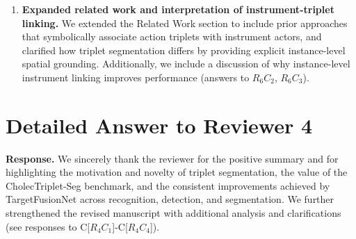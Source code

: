 \documentclass{article}
\begin{document}
\begin{enumerate}
    \item \textbf{Expanded related work and interpretation of instrument-triplet linking.}
    We extended the Related Work section to include prior approaches that symbolically associate action triplets with instrument actors, and clarified how triplet segmentation differs by providing explicit instance-level spatial grounding. Additionally, we include a discussion of why instance-level instrument linking improves performance (answers to \hyperref[reviewer_6_2]{$R_{6}C_{2}$}, \hyperref[reviewer_6_3]{$R_{6}C_{3}$}).
\end{enumerate}


\section{Detailed Answer to Reviewer 4}


\textbf{Response.}
We sincerely thank the reviewer for the positive summary and for highlighting the motivation and novelty of triplet segmentation, the value of the CholecTriplet-Seg benchmark, and the consistent improvements achieved by TargetFusionNet across recognition, detection, and segmentation. We further strengthened the revised manuscript with additional analysis and clarifications (see responses to C[$R_{4}C_{1}$]-C[$R_{4}C_{4}$]).
\end{document}
